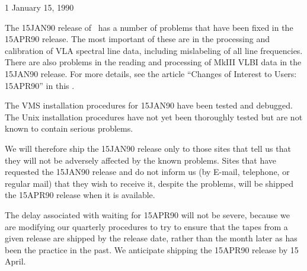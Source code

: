

 {1} {January 15, 1990}

     The 15JAN90 release of \AIPS\ has a number of problems that
have been fixed in the 15APR90 release.  The most important of these
are in the processing and calibration of VLA spectral
line data, including mislabeling of all line frequencies.  There are also
problems in the reading and processing of MkIII VLBI data in
the 15JAN90 release.  For more details, see the article ``Changes of
Interest to Users: 15APR90'' in this \AIPSLetter.

     The VMS installation procedures for 15JAN90 have been tested and
debugged.  The Unix installation procedures have not yet been
thoroughly tested but are not known to contain serious problems.

   We will therefore ship the 15JAN90 release only to those sites that
tell us that they will not be
adversely affected by the known problems.   Sites that have
requested the 15JAN90 release and do not inform us (by E-mail,
telephone, or regular mail) that they wish to receive it, despite the
problems, will be shipped the 15APR90 release when it is available.

   The delay associated with waiting for 15APR90 will not be severe,
because we are modifying our quarterly procedures to try to ensure that the
tapes from a given release are shipped by the release date, rather
than the month later as has been the practice in the past.  We
anticipate shipping the 15APR90 release by 15 April.

